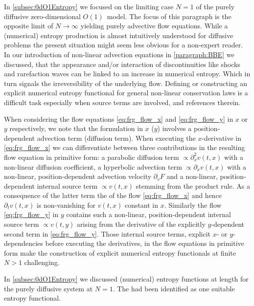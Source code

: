 In \cref{subsec:0dO1Entropy} we focused on the limiting case $N=1$ of the purely diffusive zero-dimensional $O(1)$~model.
The focus of this paragraph is the opposite limit of $N\rightarrow\infty$ yielding purely advective flow equations.
While a (numerical) entropy production is almost intuitively understood for diffusive problems the present situation might seem less obvious for a non-expert reader. 
In our introduction of non-linear advection equations in \cref{paragraph:BBE} we discussed, that the appearance and/or interaction of discontinuities like shocks and rarefaction waves can be linked to an increase in numerical entropy. 
Which in turn signals the irreversibility of the underlying flow.
Defining or constructing an explicit numerical entropy functional for general non-linear conservation laws is a difficult task especially when source terms are involved, \cf{}  and references therein. 

When considering the flow equations \eqref{eq:frg_flow_x} and \eqref{eq:frg_flow_y} in $x$ or $y$ respectively, we note that the formulation in $x$ ($y$) involves a position-dependent advection term (diffusion term).
When executing the $x$-derivative in \cref{eq:frg_flow_x} we can differentiate between three contributions in the resulting flow equation in primitive form: a parabolic diffusion term $\propto \partial_x^2 v(t,x)$ with a non-linear diffusion coefficient, a hyperbolic advection term $\propto \partial_x v(t,x)$ with a non-linear, position-dependent advection velocity $\partial_v F$ and a non-linear, position-dependent internal source term $\propto v(t,x)$ stemming from the product rule.
As a consequence of the latter term the \rhs{} of the flow \cref{eq:frg_flow_x} and hence $\partial_t v(t,x)$ is non-vanishing for $v(t,x)$ constant in $x$.
Similarly the flow \cref{eq:frg_flow_y} in $y$ contains such a non-linear, position-dependent internal source term $\propto v(t,y)$ arising from the derivative of the explicitly $y$-dependent second term in \cref{eq:frg_flow_y}. 
Those internal source terms, explicit $x$- or $y$-dependencies before executing the derivatives, in the flow equations in primitive form make the construction of explicit numerical entropy functionals at finite $N > 1$ challenging.

In \cref{subsec:0dO1Entropy} we discussed (numerical) entropy functions at length for the purely diffusive system at $N=1$.
The \tv{} had been identified as one suitable entropy functional.

